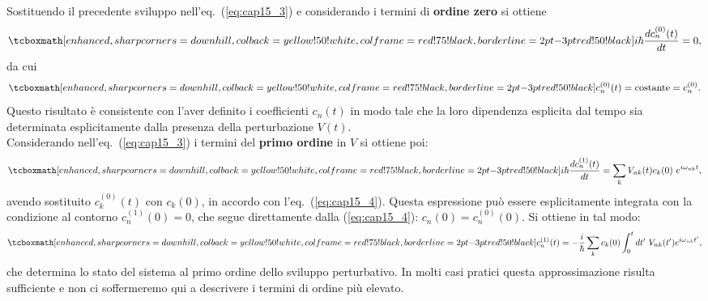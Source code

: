 Sostituendo il precedente sviluppo nell'eq.~(\ref{eq:cap15_3}) e considerando i termini di \textbf{ordine zero} si ottiene
	\begin{equation}
		\tcboxmath[enhanced, sharp corners=downhill, colback=yellow!50!white, colframe=red!75!black, borderline={2pt}{-3pt}{red!50!black}]{
			i\hbar \frac{d c_n ^{(0)}(t)}{dt}=0 ,
			}
	\end{equation}
da cui
	\begin{equation}
		\tcboxmath[enhanced, sharp corners=downhill, colback=yellow!50!white, colframe=red!75!black, borderline={2pt}{-3pt}{red!50!black}]{
			c_n ^{(0)}(t) = \textrm{costante}= c_n ^{(0)} .
			}
	\label{eq:cap15_4}
	\end{equation}
Questo risultato è consistente con l'aver definito i coefficienti $c_n (t)$ in modo tale che la loro dipendenza esplicita dal tempo sia determinata esplicitamente dalla presenza della perturbazione $V(t)$.\\

Considerando nell'eq.~(\ref{eq:cap15_3}) i termini del \textbf{primo ordine} in $V$ si ottiene poi:
	\begin{equation}
		\tcboxmath[enhanced, sharp corners=downhill, colback=yellow!50!white, colframe=red!75!black, borderline={2pt}{-3pt}{red!50!black}]{
			i\hbar \frac{d c_n ^{(1)}(t)}{dt}=\sum _k V_{nk} (t) c_k (0)\ e^{i\omega _{nk} t}  ,
			}
	\end{equation}
avendo sostituito $c_k ^{(0)} (t)$ con $c_k (0)$, in accordo con l'eq.~(\ref{eq:cap15_4}). Questa espressione può essere esplicitamente integrata con la condizione al contorno $ c_n ^{(1)} (0) =0$, che segue direttamente dalla (\ref{eq:cap15_4}): $c_n (0) = c_n ^{(0)} (0)$. Si ottiene in tal modo:
	\begin{equation}
		\tcboxmath[enhanced, sharp corners=downhill, colback=yellow!50!white, colframe=red!75!black, borderline={2pt}{-3pt}{red!50!black}]{
			c_n ^{(1)} (t) = -\frac{i}{\hbar} \sum _k c_k (0) \int _0 ^t dt'\ V_{nk} (t') e ^{i \omega _{nk} t'} ,
			}
	\label{eq:cap15_5}
	\end{equation}
che determina lo stato del sistema al primo ordine dello sviluppo perturbativo. In molti casi pratici questa approssimazione risulta sufficiente e non ci soffermeremo qui a descrivere i termini di ordine più elevato.\\

